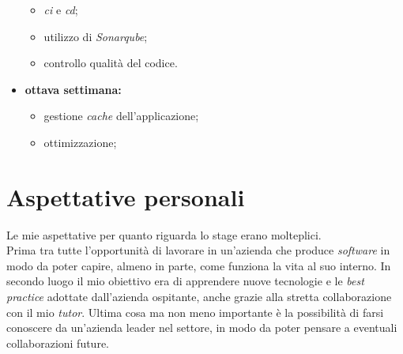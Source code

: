 \begin{itemize}
    \begin{itemize}
        \item \textit{\gls{ci}} e \textit{\gls{cd}};
        \item utilizzo di \textit{Sonarqube};
        \item controllo qualità del codice.
    \end{itemize}
    \item \textbf{ottava settimana:}
    \begin{itemize}
        \item gestione \textit{cache} dell'applicazione;
        \item ottimizzazione;
    \end{itemize}
\end{itemize}

\section{Aspettative personali}
Le mie aspettative per quanto riguarda lo stage erano molteplici.
\\Prima tra tutte l'opportunità di lavorare in un'azienda che produce \textit{software} in modo da poter capire, almeno in parte, come funziona la vita al suo interno.
In secondo luogo il mio obiettivo era di apprendere nuove tecnologie e le \textit{best practice} adottate dall'azienda ospitante, anche grazie alla stretta collaborazione con il mio \textit{tutor}.
Ultima cosa ma non meno importante è la possibilità di farsi conoscere da un'azienda leader nel settore, in modo da poter pensare a eventuali collaborazioni future.